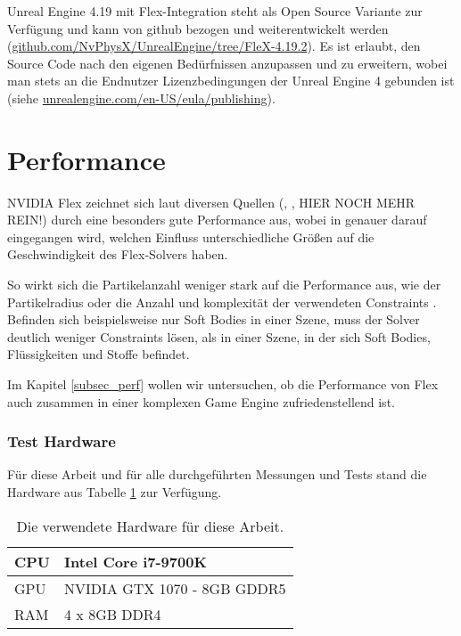 Unreal Engine 4.19 mit Flex-Integration steht als Open Source Variante zur Verfügung und kann von github bezogen und weiterentwickelt werden (\url{github.com/NvPhysX/UnrealEngine/tree/FleX-4.19.2}). Es ist erlaubt, den Source Code nach den eigenen Bedürfnissen anzupassen und zu erweitern, wobei man stets an die Endnutzer Lizenzbedingungen der Unreal Engine 4 gebunden ist (siehe \url{unrealengine.com/en-US/eula/publishing}).



\section{Performance}


NVIDIA Flex zeichnet sich laut diversen Quellen (\cite{FlexD3D}, \cite{UPP}, HIER NOCH MEHR REIN!) durch eine besonders gute Performance aus, wobei in \cite{FlexD3D} genauer darauf eingegangen wird, welchen Einfluss unterschiedliche Größen auf die Geschwindigkeit des Flex-Solvers haben. 

So wirkt sich die Partikelanzahl weniger stark auf die Performance aus, wie der Partikelradius oder die Anzahl und komplexität der verwendeten Constraints \cite{FlexD3D}. Befinden sich beispielsweise nur Soft Bodies in einer Szene, muss der Solver deutlich weniger Constraints lösen, als in einer Szene, in der sich Soft Bodies, Flüssigkeiten und Stoffe befindet.


Im Kapitel \ref{subsec_perf} wollen wir untersuchen, ob die Performance von Flex auch zusammen in einer komplexen Game Engine zufriedenstellend ist.

\subsubsection{Test Hardware}

Für diese Arbeit und für alle durchgeführten Messungen und Tests stand die Hardware aus Tabelle \ref{table_hardware} zur Verfügung.

\clearpage

\begin{table}[]
\caption{Die verwendete Hardware für diese Arbeit.}
\label{table_hardware}
\begin{tabular}{l|l}
 \hline
CPU & Intel Core i7-9700K  \\ \hline
GPU & NVIDIA GTX 1070 - 8GB GDDR5      \\ \hline
RAM & 4 x 8GB DDR4            \\ \hline
\end{tabular}
\end{table}

